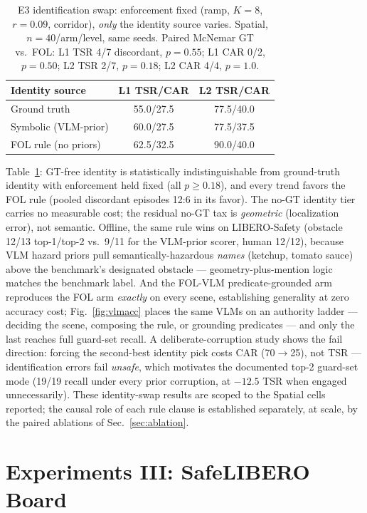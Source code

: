 \documentclass[conference]{IEEEtran}
\begin{document}
\begin{table}[t]
\centering
\caption{E3 identification swap: enforcement fixed (ramp, $K{=}8$, $r{=}0.09$, corridor), \emph{only} the identity source varies. Spatial, $n{=}40$/arm/level, same seeds. Paired McNemar GT vs.\ FOL: L1 TSR 4/7 discordant, $p=0.55$; L1 CAR 0/2, $p=0.50$; L2 TSR 2/7, $p=0.18$; L2 CAR 4/4, $p=1.0$.}
\label{tab:e3}
\begin{tabular}{lcc}
\toprule
Identity source & L1 TSR/CAR & L2 TSR/CAR \\
\midrule
Ground truth & 55.0/27.5 & 77.5/40.0 \\
Symbolic (VLM-prior) & 60.0/27.5 & 77.5/37.5 \\
FOL rule (no priors) & 62.5/32.5 & 90.0/40.0 \\
\bottomrule
\end{tabular}
\end{table}

Table~\ref{tab:e3}: GT-free identity is statistically indistinguishable from ground-truth identity with enforcement held fixed (all $p\ge0.18$), and every trend favors the FOL rule (pooled discordant episodes 12:6 in its favor). The no-GT identity tier carries no measurable cost; the residual no-GT tax is \emph{geometric} (localization error), not semantic. Offline, the same rule wins on LIBERO-Safety (obstacle 12/13 top-1/top-2 vs.\ 9/11 for the VLM-prior scorer, human 12/12), because VLM hazard priors pull semantically-hazardous \emph{names} (ketchup, tomato sauce) above the benchmark's designated obstacle --- geometry-plus-mention logic matches the benchmark label. And the FOL-VLM predicate-grounded arm reproduces the FOL arm \emph{exactly} on every scene, establishing generality at zero accuracy cost; Fig.~\ref{fig:vlmacc} places the same VLMs on an authority ladder --- deciding the scene, composing the rule, or grounding predicates --- and only the last reaches full guard-set recall. A deliberate-corruption study shows the fail direction: forcing the second-best identity pick costs CAR (70$\to$25), not TSR --- identification errors fail \emph{unsafe}, which motivates the documented top-2 guard-set mode (19/19 recall under every prior corruption, at $-12.5$ TSR when engaged unnecessarily). These identity-swap results are scoped to the Spatial cells reported; the causal role of each rule clause is established separately, at scale, by the paired ablations of Sec.~\ref{sec:ablation}.

\section{Experiments III: SafeLIBERO Board}
\label{sec:board}
\end{document}
